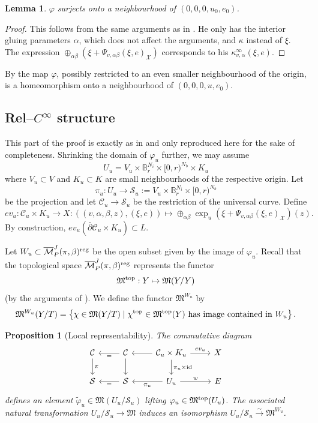 \documentclass[11pt,psamsfonts, oneside, reqno]{amsart}
\newcommand{\set}[1]{\left\{ #1 \right\}}
\newcommand{\sub}{\subset}%
\newcommand{\cl}{\colon}
\newcommand{\xra}{\xrightarrow}
\newcommand{\eva}{ev}
\newcommand{\ide}{\normalfont\text{id}}
\newcommand{\reg}{\normalfont\text{reg}}
\newcommand{\Mbar}{\overline{\mathcal M}}
\newcommand{\delbar}{\bar\partial}
\newcommand{\bB}{\mathbb{B}}
\newcommand{\cC}{\mathcal{C}}
\newcommand{\cS}{\mathcal{S}}
\newcommand{\cX}{\mathcal{X}}
\newcommand{\fM}{\mathfrak{M}}
\newcommand{\wt}{\widetilde}
\newtheorem{lemma}[theorem]{Lemma}
\newtheorem{proposition}[theorem]{Proposition}
\theoremstyle{definition}
\theoremstyle{remark}
\numberwithin{equation}{section}
\begin{document}
\begin{lemma}\label{lem:gluing-surjective} $\varphi$ surjects onto a neighbourhood of $(0,0,0,u_0,e_0)$. 
\end{lemma}

\begin{proof} This follows from the same arguments as in \cite[Proposition~B.11.5]{P16}. He only has the interior gluing parameters $\alpha$, which does not affect the arguments, and $\kappa$ instead of $\xi$. The expression $\oplus_{\alpha\beta}(\xi +\Psi_{v,\alpha\beta}(\xi,e)_\cX)$ corresponds to his $\kappa^\infty_{v,\alpha}(\xi,e)$.
\end{proof}

\noindent
By \cite[Lemma~B.12.1]{P16} the map $\varphi$, possibly restricted to an even smaller neighbourhood of the origin, is a homeomorphism onto a neighbourhood of $(0,0,0,u,e_0)$. 
\subsection{Rel--$C^\infty$ structure}


This part of the proof is exactly as in \cite[.]{Swa21} and only reproduced here for the sake of completeness. Shrinking the domain of $\varphi_u$ further, we may assume  
$$U_u = V_u \times \bB_r^{N_i}\times [0,r)^{N_b}\times K_u$$
where $V_u \sub V$ and $K_u \sub K$ are small neighbourhoods of the respective origin. Let 
$$\pi_u \cl U_u \to \cS_u := V_u \times \bB_r^{N_i}\times [0,r)^{N_b}$$ 
be the projection and let $\cC_u \to \cS_u$ be the restriction of the universal curve. Define 
$$\eva_u \cl \cC_u \times K_u \to X : ((v,\alpha,\beta,z),(\xi,e))\mapsto \oplus_{\alpha\beta}\exp_u(\xi + \Psi_{v,\alpha\beta}(\xi,e)_\cX)(z).$$
By construction, $\eva_u(\delbar \cC_u\times K_u)\sub L$.\par
Let $W_u \sub \Mbar_{P}^J(\pi,\beta)^{\reg}$ be the open subset given by the image of $\varphi_u$. Recall that the topological space $\Mbar_{P}^J(\pi,\beta)^{\reg}$ represents the functor 
$$\fM^{\normalfont\text{top}} : Y\mapsto \fM(Y/Y)$$ 
(by the arguments of \cite[.2]{Swa21}). We define the functor $\fM^{W_u}$ by
$$\fM^{W_u}(Y/T) = \set{\chi \in \fM(Y/T)\mid \chi^{\normalfont\text{top}}\in \fM^{\normalfont\text{top}}(Y) \text{ has image contained in }W_u}.$$ 

\begin{proposition}[Local representability]\label{prop:local-representability} The commutative diagram
		\begin{equation}\label{} \begin{tikzcd}
			\cC  \arrow[d,"\pi"]&\cC\arrow[l,"="] \arrow[d,""] & \cC_u\times K_u\arrow[r,"\eva_u"]\arrow[l,""]\arrow[d,"\pi_u\times\ide"]  & X\\ 
			\cS & \cS \arrow[l,"="] & U_u\arrow[l,"\pi_u"]\arrow[r,"w"] & E \end{tikzcd} \end{equation} 
		defines an element $\wt\varphi_u \in \fM(U_u/\cS_u)$ lifting $\varphi_u \in \fM^{\normalfont\text{top}}(U_u)$. The associated natural transformation $U_u/\cS_u \to \fM$ induces an isomorphism $U_u/\cS_u \xra{\sim}\fM^{W_u}$. 
\end{proposition}
\end{document}
